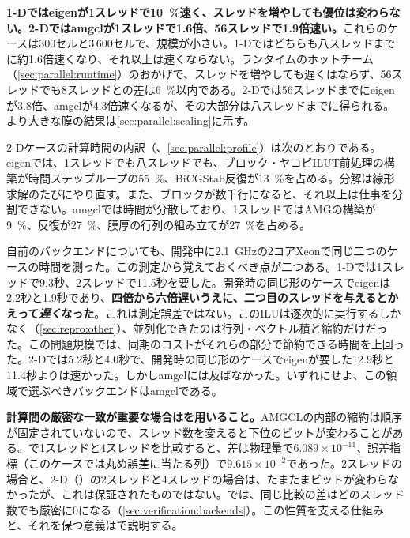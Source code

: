 \textbf{1-Dではeigenが1スレッドで\SI{10}{\percent}速く、スレッドを増やしても優位は変わらない。2-Dではamgclが1スレッドで1.6倍、56スレッドで1.9倍速い。}これらのケースは300セルと3\,600セルで、規模が小さい。1-Dではどちらも八スレッドまでに約1.6倍速くなり、それ以上は速くならない。ランタイムのホットチーム（\cref{sec:parallel:runtime}）のおかげで、スレッドを増やしても遅くはならず、56スレッドでも8スレッドとの差は\SI{6}{\percent}以内である。2-Dでは56スレッドまでにeigenが3.8倍、amgclが4.3倍速くなるが、その大部分は八スレッドまでに得られる。より大きな膜の結果は\cref{sec:parallel:scaling}に示す。

2-Dケースの計算時間の内訳（、\cref{sec:parallel:profile}）は次のとおりである。eigenでは、1スレッドでも八スレッドでも、ブロック・ヤコビILUT前処理の構築が時間ステップループの\SI{55}{\percent}、BiCGStab反復が\SI{13}{\percent}を占める。分解は線形求解のたびにやり直す。また、ブロックが数千行になると、それ以上は仕事を分割できない。amgclでは時間が分散しており、1スレッドではAMGの構築が\SI{9}{\percent}、反復が\SI{27}{\percent}、膜厚の行列の組み立てが\SI{27}{\percent}を占める。

自前のバックエンドについても、開発中に\SI{2.1}{\giga\hertz}の2コアXeonで同じ二つのケースの時間を測った。この測定から覚えておくべき点が二つある。1-Dでは1スレッドで9.3秒、2スレッドで11.5秒を要した。開発時の同じ形のケースでeigenは2.2秒と1.9秒であり、\textbf{四倍から六倍遅いうえに、二つ目のスレッドを与えるとかえって\emph{遅く}なった}。これは測定誤差ではない。このILUは逐次的に実行するしかなく（\cref{sec:repro:other}）、並列化できたのは行列・ベクトル積と縮約だけだった。この問題規模では、同期のコストがそれらの部分で節約できる時間を上回った。2-Dでは5.2秒と4.0秒で、開発時の同じ形のケースでeigenが要した12.9秒と11.4秒よりは速かった。しかしamgclには及ばなかった。いずれにせよ、この領域で選ぶべきバックエンドはamgclである。

\textbf{計算間の厳密な一致が重要な場合はを用いること。}AMGCLの内部の縮約は順序が固定されていないので、スレッド数を変えると下位のビットが変わることがある。で1スレッドと4スレッドを比較すると、差は物理量で$6.089\times10^{-11}$、誤差指標（このケースでは丸め誤差に当たる列）で$9.615\times10^{-2}$であった。2スレッドの場合と、2-D（）の2スレッドと4スレッドの場合は、たまたまビットが変わらなかったが、これは保証されたものではない。では、同じ比較の差はどのスレッド数でも厳密に$0$になる（\cref{sec:verification:backends}）。この性質を支える仕組みと、それを保つ意義はで説明する。

